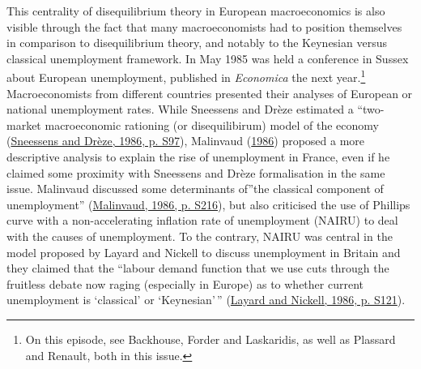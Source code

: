 \documentclass[
  12pt,
  onecolumn]{article}
\begin{document}
This centrality of disequilibrium theory in European macroeconomics is
also visible through the fact that many macroeconomists had to position
themselves in comparison to disequilibrium theory, and notably to the
Keynesian versus classical unemployment framework. In May 1985 was held
a conference in Sussex about European unemployment, published in
\emph{Economica} the next year.\footnote{On this episode, see Backhouse,
  Forder and Laskaridis, as well as Plassard and Renault, both in this
  issue.} Macroeconomists from different countries presented their
analyses of European or national unemployment rates. While Sneessens and
Drèze estimated a ``two-market macroeconomic rationing (or
disequilibirum) model of the economy
(\protect\hyperlink{ref-sneessens1986}{Sneessens and Drèze, 1986, p.
S97}), Malinvaud (\protect\hyperlink{ref-malinvaud1986}{1986}) proposed
a more descriptive analysis to explain the rise of unemployment in
France, even if he claimed some proximity with Sneessens and Drèze
formalisation in the same issue. Malinvaud discussed some determinants
of''the classical component of unemployment''
(\protect\hyperlink{ref-malinvaud1986}{Malinvaud, 1986, p. S216}), but
also criticised the use of Phillips curve with a non-accelerating
inflation rate of unemployment (NAIRU) to deal with the causes of
unemployment. To the contrary, NAIRU was central in the model proposed
by Layard and Nickell to discuss unemployment in Britain and they
claimed that the ``labour demand function that we use cuts through the
fruitless debate now raging (especially in Europe) as to whether current
unemployment is `classical' or `Keynesian'\,''
(\protect\hyperlink{ref-layard1986}{Layard and Nickell, 1986, p. S121}).
\end{document}
